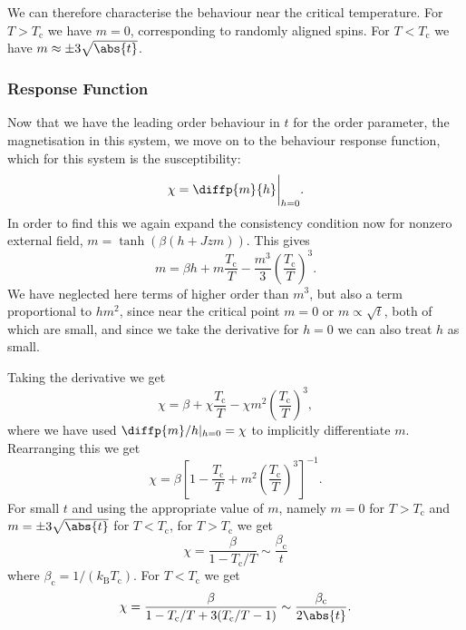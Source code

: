 \documentclass[fleqn]{NotesClass}
\newcommand*{\boltzmann}{k_{\mathrm{B}}}
\begin{document}
    We can therefore characterise the behaviour near the critical temperature.
    For \(T > T_{\mathrm{c}}\) we have \(m = 0\), corresponding to randomly aligned spins.
    For \(T < T_{\mathrm{c}}\) we have \(m \approx \pm 3\sqrt{\abs{t}}\).
    
    \subsubsection{Response Function}
    Now that we have the leading order behaviour in \(t\) for the order parameter, the magnetisation in this system, we move on to the behaviour response function, which for this system is the susceptibility:
    \begin{equation}
        \chi = \diffp{m}{h}\bigg\vert_{h = 0}.
    \end{equation}
    In order to find this we again expand the consistency condition now for nonzero external field, \(m = \tanh(\beta(h + Jzm))\).
    This gives
    \begin{equation}
        m = \beta h + m\frac{T_{\mathrm{c}}}{T} - \frac{m^3}{3}\left( \frac{T_{\mathrm{c}}}{T} \right)^3.
    \end{equation}
    We have neglected here terms of higher order than \(m^3\), but also a term proportional to \(hm^2\), since near the critical point \(m = 0\) or \(m \propto \sqrt{t}\), both of which are small, and since we take the derivative for \(h = 0\) we can also treat \(h\) as small.
    
    Taking the derivative we get
    \begin{equation}
        \chi = \beta + \chi \frac{T_{\mathrm{c}}}{T} - \chi m^2 \left( \frac{T_{\mathrm{c}}}{T} \right)^3,
    \end{equation}
    where we have used \(\diffp{m}/{h}|_{h = 0} = \chi\) to implicitly differentiate \(m\).
    Rearranging this we get
    \begin{equation}
        \chi = \beta\left[ 1 - \frac{T_{\mathrm{c}}}{T} + m^2\left( \frac{T_{\mathrm{c}}}{T} \right)^3 \right]^{-1}.
    \end{equation}
    For small \(t\) and using the appropriate value of \(m\), namely \(m = 0\) for \(T > T_{\mathrm{c}}\) and \(m = \pm 3\sqrt{\abs{t}}\) for \(T < T_{\mathrm{c}}\), for \(T > T_{\mathrm{c}}\) we get
    \begin{equation}
        \chi = \frac{\beta}{1 - T_{\mathrm{c}}/T} \sim \frac{\beta_{\mathrm{c}}}{t}
    \end{equation}
    where \(\beta_{\mathrm{c}} = 1/(\boltzmann T_{\mathrm{c}})\).
    For \(T < T_{\mathrm{c}}\) we get
    \begin{equation}
        \chi = \frac{\beta}{1 - T_{\mathrm{c}}/T + 3(T_{\mathrm{c}}/T - 1)} \sim \frac{\beta_{\mathrm{c}}}{2\abs{t}}.
    \end{equation}
    
\end{document}
